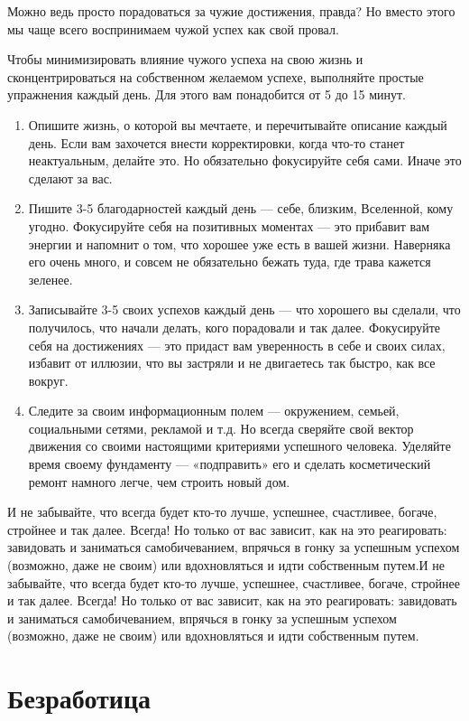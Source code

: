 Можно ведь просто порадоваться за чужие достижения, правда? Но вместо этого мы чаще всего воспринимаем чужой успех как свой провал.

Чтобы минимизировать влияние чужого успеха на свою жизнь и сконцентрироваться на собственном желаемом успехе, выполняйте простые упражнения каждый день. Для этого вам понадобится от 5 до 15 минут.


\begin{enumerate}
    \item Опишите жизнь, о которой вы мечтаете, и перечитывайте описание каждый день. Если вам захочется внести корректировки, когда что-то станет неактуальным, делайте это. Но обязательно фокусируйте себя сами. Иначе это сделают за вас.
    \item Пишите 3-5 благодарностей каждый день — себе, близким, Вселенной, кому угодно. Фокусируйте себя на позитивных моментах — это прибавит вам энергии и напомнит о том, что хорошее уже есть в вашей жизни. Наверняка его очень много, и совсем не обязательно бежать туда, где трава кажется зеленее.
    \item Записывайте 3-5 своих успехов каждый день — что хорошего вы сделали, что получилось, что начали делать, кого порадовали и так далее. Фокусируйте себя на достижениях — это придаст вам уверенность в себе и своих силах, избавит от иллюзии, что вы застряли и не двигаетесь так быстро, как все вокруг.
    \item Следите за своим информационным полем — окружением, семьей, социальными сетями, рекламой и т.д. Но всегда сверяйте свой вектор движения со своими настоящими критериями успешного человека. Уделяйте время своему фундаменту — «подправить» его и сделать косметический ремонт намного легче, чем строить новый дом.
\end{enumerate}

И не забывайте, что всегда будет кто-то лучше, успешнее, счастливее, богаче, стройнее и так далее. Всегда! Но только от вас зависит, как на это реагировать: завидовать и заниматься самобичеванием, впрячься в гонку за успешным успехом (возможно, даже не своим) или вдохновляться и идти собственным путем.И не забывайте, что всегда будет кто-то лучше, успешнее, счастливее, богаче, стройнее и так далее. Всегда! Но только от вас зависит, как на это реагировать: завидовать и заниматься самобичеванием, впрячься в гонку за успешным успехом (возможно, даже не своим) или вдохновляться и идти собственным путем.


\newpage
\section{Безработица}

